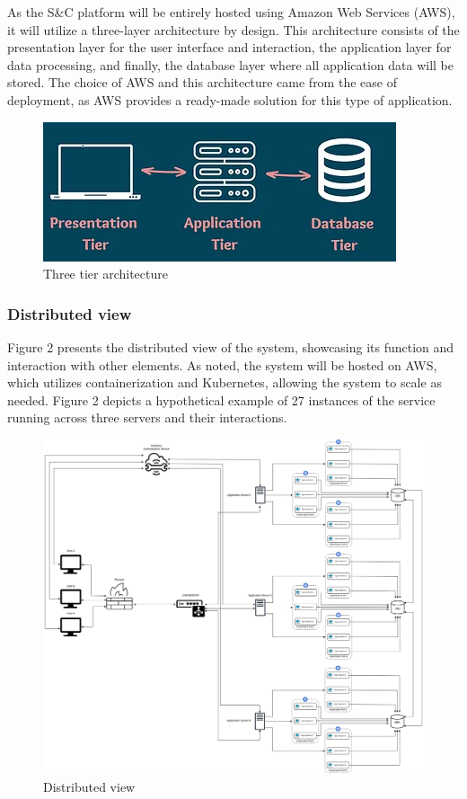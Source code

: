 As the S\&C platform will be entirely hosted using Amazon Web Services (AWS), it will utilize a three-layer architecture by design. This architecture consists of the presentation layer for the user interface and interaction, the application layer for data processing, and finally, the database layer where all application data will be stored. The choice of AWS and this architecture came from the ease of deployment, as AWS provides a ready-made solution for this type of application.

\begin{figure}[h]
    \centering
    \includegraphics[width=1\linewidth]{DD-Latex//assets/Three tier.jpg}
    \caption{Three tier architecture \cite{MToC_2023}}
    \label{fig:Three tier}
\end{figure}

\subsubsection{Distributed view} 
Figure 2 presents the distributed view of the system, showcasing its function and interaction with other elements. As noted, the system will be hosted on AWS, which utilizes containerization and Kubernetes, allowing the system to scale as needed. Figure 2 depicts a hypothetical example of 27 instances of the service running across three servers and their interactions.
\newpage
\begin{figure}[h]
    \centering
    \includegraphics[width=1\linewidth]{DD-Latex//assets//Distributed View/Distributed View.jpg}
    \caption{Distributed view}
    \label{fig:Distributed view}
\end{figure}


